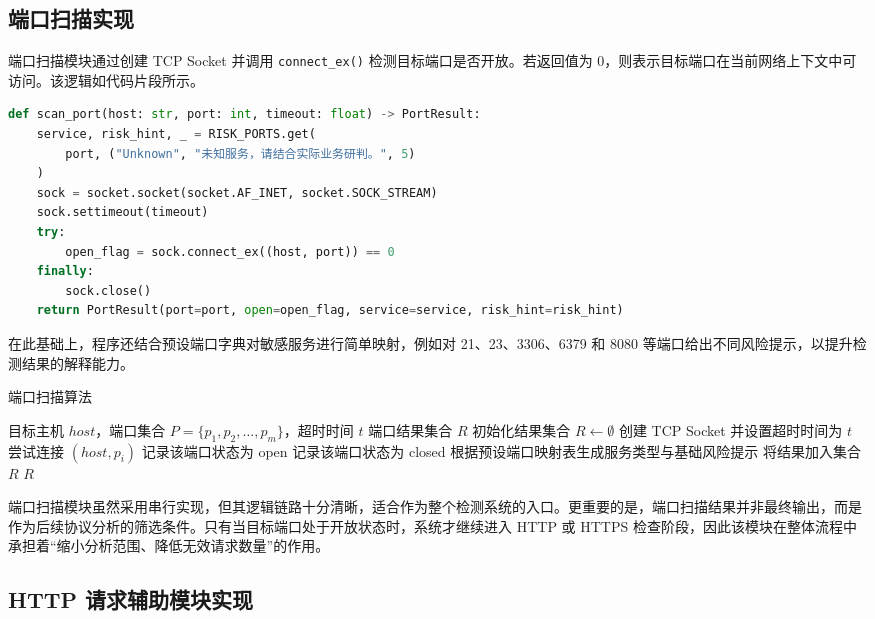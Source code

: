 \documentclass[12pt,a4paper,fontset=none]{ctexart}
\begin{document}
\subsection{端口扫描实现}

端口扫描模块通过创建 TCP Socket 并调用 \texttt{connect\_ex()} 检测目标端口是否开放。若返回值为 0，则表示目标端口在当前网络上下文中可访问。该逻辑如代码片段所示。

\begin{lstlisting}[language=Python,caption={端口扫描核心逻辑}]
def scan_port(host: str, port: int, timeout: float) -> PortResult:
    service, risk_hint, _ = RISK_PORTS.get(
        port, ("Unknown", "未知服务，请结合实际业务研判。", 5)
    )
    sock = socket.socket(socket.AF_INET, socket.SOCK_STREAM)
    sock.settimeout(timeout)
    try:
        open_flag = sock.connect_ex((host, port)) == 0
    finally:
        sock.close()
    return PortResult(port=port, open=open_flag, service=service, risk_hint=risk_hint)
\end{lstlisting}

在此基础上，程序还结合预设端口字典对敏感服务进行简单映射，例如对 21、23、3306、6379 和 8080 等端口给出不同风险提示，以提升检测结果的解释能力。

\begin{algorithm}[H]
\caption{端口扫描算法}
\label{alg:port-scan}
\begin{algorithmic}[1]
\Require 目标主机 $host$，端口集合 $P=\{p_1,p_2,\dots,p_m\}$，超时时间 $t$
\Ensure 端口结果集合 $R$
\State 初始化结果集合 $R \gets \emptyset$
  \State 创建 TCP Socket 并设置超时时间为 $t$
  \State 尝试连接 $(host, p_i)$
    \State 记录该端口状态为 open
  \Else
    \State 记录该端口状态为 closed
  \EndIf
  \State 根据预设端口映射表生成服务类型与基础风险提示
  \State 将结果加入集合 $R$
\EndFor
\State \Return $R$
\end{algorithmic}
\end{algorithm}

端口扫描模块虽然采用串行实现，但其逻辑链路十分清晰，适合作为整个检测系统的入口。更重要的是，端口扫描结果并非最终输出，而是作为后续协议分析的筛选条件。只有当目标端口处于开放状态时，系统才继续进入 HTTP 或 HTTPS 检查阶段，因此该模块在整体流程中承担着“缩小分析范围、降低无效请求数量”的作用。

\subsection{HTTP 请求辅助模块实现}
\end{document}
